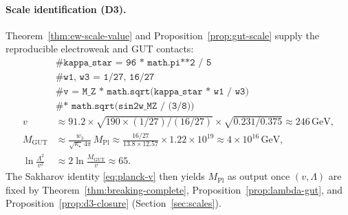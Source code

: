 \documentclass[aps,prd,onecolumn,amsmath,amssymb,nofootinbib,11pt]{revtex4-2}
\numberwithin{equation}{section}
\theoremstyle{plain}
\theoremstyle{definition}
\theoremstyle{remark}
\newcommand{\MPl}{M_{\mathrm{Pl}}}
\begin{document}
\paragraph{Scale identification (D3).}
Theorem~\ref{thm:ew-scale-value} and Proposition~\ref{prop:gut-scale} supply
the reproducible electroweak and GUT contacts:
\begin{equation}\label{eq:workbook-planck}
\begin{aligned}
  &\texttt{\# kappa\_star = 96 * math.pi**2 / 5}\\
  &\texttt{\# w1, w3 = 1/27, 16/27}\\
  &\texttt{\# v = M\_Z * math.sqrt(kappa\_star * w1 / w3)}\\
  &\texttt{\#      * math.sqrt(sin2w\_MZ / (3/8))}\\
  v
  &\approx 91.2\times\sqrt{190\times(1/27)/(16/27)}\times\sqrt{0.231/0.375}
  \approx 246\,\mathrm{GeV},\\
  M_{\mathrm{GUT}}
  &\approx \frac{w_3}{\sqrt{\kappa_\star}\,4\pi}\,\MPl
  \approx \frac{16/27}{13.8\times 12.57}\times 1.22\times 10^{19}
  \approx 4\times 10^{16}\,\mathrm{GeV},\\
  \ln\!\frac{\Lambda^2}{v^2}
  &\approx 2\ln\!\frac{M_{\mathrm{GUT}}}{v}
  \approx 65.
\end{aligned}
\end{equation}
The Sakharov identity \eqref{eq:planck-v} then yields $\MPl$ as output once
$(v,\Lambda)$ are fixed by Theorem~\ref{thm:breaking-complete},
Proposition~\ref{prop:lambda-gut}, and Proposition~\ref{prop:d3-closure}
(Section~\ref{sec:scales}).
\end{document}
